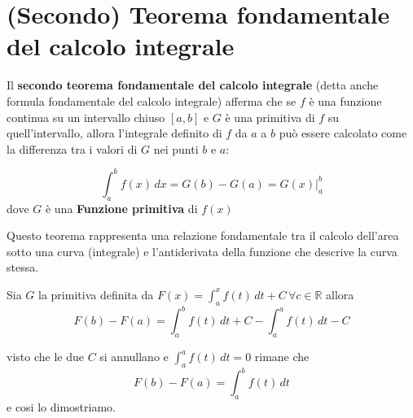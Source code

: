 \documentclass{article}
\begin{document}
\section{(Secondo) Teorema fondamentale del calcolo integrale}
Il \textbf{secondo teorema fondamentale del calcolo integrale} (detta anche
formula fondamentale del calcolo integrale) afferma che se $f$ è una funzione
continua su un intervallo chiuso $[a,b]$ e $G$ è una primitiva di $f$ su
quell'intervallo, allora l'integrale definito di $f$ da $a$ a $b$ può essere
calcolato come la differenza tra i valori di $G$ nei punti $b$ e $a$:

$$
    \int_a^b f(x) \, dx = G(b) - G(a) = G(x)|_{a}^{b}
$$
dove $G$ è una \textbf{Funzione primitiva} di $f(x)$

Questo teorema rappresenta una relazione fondamentale tra il calcolo dell'area
sotto una curva (integrale) e l'antiderivata della funzione che descrive la
curva stessa.

Sia $G$ la primitiva definita da $F(x)= \int_{a}^x f(t) \, dt + C \, \forall c
    \in \mathbb{R}$ allora $$ F(b)- F(a)= \int_{a}^b f(t) \, dt + C - \int_{a}^a
    f(t) \, dt - C $$

visto che le due $C$ si annullano e $\int_{a}^a f(t) \, dt = 0$ rimane che $$
    F(b)- F(a)= \int_{a}^b f(t) \, dt $$ e cosi lo dimostriamo.
\end{document}
